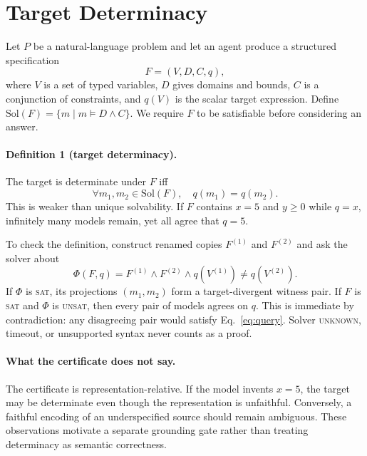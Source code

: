 \documentclass[sigconf,anonymous]{aamas}
\newcommand{\sat}{\textsc{sat}}
\newcommand{\unsat}{\textsc{unsat}}
\begin{document}
\section{Target Determinacy}
Let $P$ be a natural-language problem and let an agent produce a structured specification
\[
F=(V,D,C,q),
\]
where $V$ is a set of typed variables, $D$ gives domains and bounds, $C$ is a conjunction of constraints, and $q(V)$ is the scalar target expression.  Define $\mathrm{Sol}(F)=\{m\mid m\models D\land C\}$.  We require $F$ to be satisfiable before considering an answer.

\paragraph{Definition 1 (target determinacy).}
The target is determinate under $F$ iff
\[
\forall m_1,m_2\in\mathrm{Sol}(F),\quad q(m_1)=q(m_2).
\]
This is weaker than unique solvability.  If $F$ contains $x=5$ and $y\ge0$ while $q=x$, infinitely many models remain, yet all agree that $q=5$.

To check the definition, construct renamed copies $F^{(1)}$ and $F^{(2)}$ and ask the solver about
\begin{equation}
\Phi(F,q)=F^{(1)}\land F^{(2)}\land q(V^{(1)})\ne q(V^{(2)}).
\label{eq:query}
\end{equation}
If $\Phi$ is \sat, its projections $(m_1,m_2)$ form a target-divergent witness pair.  If $F$ is \sat{} and $\Phi$ is \unsat, then every pair of models agrees on $q$.  This is immediate by contradiction: any disagreeing pair would satisfy Eq.~\eqref{eq:query}.  Solver \textsc{unknown}, timeout, or unsupported syntax never counts as a proof.

\paragraph{What the certificate does not say.}
The certificate is representation-relative.  If the model invents $x=5$, the target may be determinate even though the representation is unfaithful.  Conversely, a faithful encoding of an underspecified source should remain ambiguous.  These observations motivate a separate grounding gate rather than treating determinacy as semantic correctness.
\end{document}
